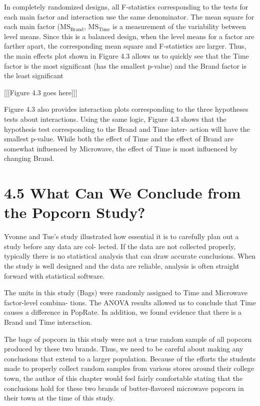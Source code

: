 \documentclass[
]{report}
\theoremstyle{definition}
\theoremstyle{definition}
\theoremstyle{definition}
\theoremstyle{definition}
\theoremstyle{remark}
\begin{document}
In completely randomized designs, all F-statistics corresponding to the tests for each main factor and
interaction use the same denominator. The mean square for each main factor (\(\mathrm{MS}_{\mathrm{Brand}}\), \(\mathrm{MS}_{\mathrm{Time}}\) is a measurement of the variability between level means. Since this is a balanced design, when the level means
for a factor are farther apart, the corresponding mean square and F-statistics are larger. Thus, the main effects
plot shown in Figure 4.3 allows us to quickly see that the Time factor is the most significant (has the smallest
p-value) and the Brand factor is the least significant

{[}{[}{[}Figure 4.3 goes here{]}{]}{]}

Figure 4.3 also provides interaction plots corresponding to the three hypotheses tests about interactions.
Using the same logic, Figure 4.3 shows that the hypothesis test corresponding to the Brand and Time inter-
action will have the smallest p-value. While both the effect of Time and the effect of Brand are somewhat
influenced by Microwave, the effect of Time is most influenced by changing Brand.

\hypertarget{what-can-we-conclude-from-the-popcorn-study}{%
\chapter{4.5 What Can We Conclude from the Popcorn Study?}\label{what-can-we-conclude-from-the-popcorn-study}}

Yvonne and Tue's study illustrated how essential it is to carefully plan out a study before any data are col-
lected. If the data are not collected properly, typically there is no statistical analysis that can draw accurate
conclusions. When the study is well designed and the data are reliable, analysis is often straight forward with
statistical software.

The units in this study (Bags) were randomly assigned to Time and Microwave factor-level combina-
tions. The ANOVA results allowed us to conclude that Time causes a difference in PopRate. In addition, we
found evidence that there is a Brand and Time interaction.

The bags of popcorn in this study were not a true random sample of all popcorn produced by these two
brands. Thus, we need to be careful about making any conclusions that extend to a larger population. Because
of the efforts the students made to properly collect random samples from various stores around their college
town, the author of this chapter would feel fairly comfortable stating that the conclusions hold for these two
brands of butter-flavored microwave popcorn in their town at the time of this study.
\end{document}
